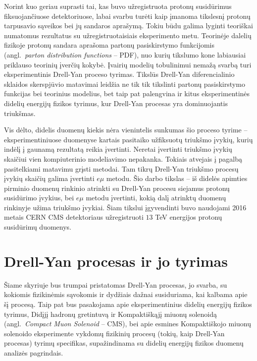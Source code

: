 \documentclass[a4paper, 12pt]{article}
\newcommand{\emu}{e\mu}
\begin{document}
Norint kuo geriau suprasti tai, kas buvo užregistruota protonų susidūrimus
fiksuojančiuose detektoriuose, labai svarbu turėti kaip įmanoma tikslesnį protonų
tarpusavio sąveikos bei jų sandaros aprašymą.
Tokiu būdu galima lyginti teoriškai numatomus rezultatus su užregistruotaisiais eksperimento
metu.
Teorinėje dalelių fizikoje protonų sandara aprašoma partonų pasiskirstymo funkcijomis
(angl.\ \textit{parton distribution functions} -- PDF), nuo kurių tikslumo kone labiausiai
priklauso teorinių įverčių kokybė.
Įvairių modelių tobulinimui nemažą svarbą turi eksperimentinis Drell-Yan proceso tyrimas.
Tikslūs Drell-Yan diferencialinio sklaidos skerspjūvio matavimai leidžia ne tik tik tikslinti
partonų pasiskirstymo funkcijas bei teorinius modelius, bet taip pat palengvina ir kitus
eksperimentinės didelių energijų fizikos tyrimus, kur Drell-Yan procesas yra dominuojantis triukšmas.

Vis dėlto, didelis duomenų kiekis nėra vienintelis sunkumas šio proceso tyrime -- eksperimentiniuose
duomenyse kartais pasitaiko užfiksuotų triukšmo įvykių, kurių indėlį į gaunamą rezultatą reikia
įvertinti.
Neretai įvertinti triukšmo įvykių skaičiui vien kompiuterinio modeliavimo nepakanka.
Tokiais atvejais į pagalbą pasitelkiami matavimu grįsti metodai.
Tam tikrų Drell-Yan triukšmo procesų įvykių skaičių galima įvertinti $\emu$ metodu.
Šio darbo tikslas -- iš didelės apimties pirminio duomenų rinkinio atrinkti su Drell-Yan
procesu siejamus protonų susidūrimo įvykius, bei $\emu$ metodu įvertinti, kokią dalį atrinktų
duomenų rinkinyje užima triukšmo įvykiai. Šiam tikslui įgyvendinti buvo naudojami 2016 metais
CERN CMS detektoriaus užregistruoti $13$ TeV energijos protonų susidūrimų duomenys.

\clearpage

\section{Drell-Yan procesas ir jo tyrimas}

Šiame skyriuje bus trumpai pristatomas Drell-Yan procesas, jo svarba, su kokiomis fizikinėmis
sąvokomis ir dydžiais dažnai susiduriama, kai kalbama apie šį procesą.
Taip pat bus pasakojama apie eksperimentinius didelių energijų fizikos tyrimus, Didįjį hadronų
gretintuvą ir Kompaktiškąjį miuonų solenoidą (angl.\ \textit{Compact Muon Solenoid} -- CMS),
bei apie esmines Kompaktiškojo miuonų solenoido eksperimente vykdomų fizikinių procesų (tokių,
kaip Drell-Yan procesas) tyrimų specifikas, supažindinama su didelių energijų fizikos duomenų
analizės pagrindais.
\end{document}
